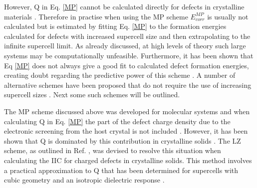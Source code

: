 \documentclass[11pt, twoside]{report}
\begin{document}
However, Q in Eq. \ref{MP} cannot be calculated directly for defects in crystalline materials \cite{Lany_defects_2008}. Therefore in practise when using the MP scheme $E^{MP}_{corr}$ is usually not calculated but is estimated by fitting Eq. \ref{MP} to the formation energies calculated for defects with increased supercell size and then extrapolating to the infinite supercell limit. As already discussed, at high levels of theory such large systems may be computationally unfeasible. Furthermore, it has been shown that Eq \ref{MP} does not always give a good fit to calculated defect formation energies, creating doubt regarding the predictive power of this scheme \cite{FNV}. A number of alternative schemes have been proposed that do not require the use of increasing supercell sizes \cite{MP, LeslieGillan, PeterSchultz, Lany_defects, FNV, kumagai_oba}. Next some such schemes will be outlined. 


The MP scheme \cite{MP} discussed above was developed for molecular systems and when calculating Q in Eq. \ref{MP} the part of the defect charge density due to the electronic screening from the host crystal is not included \cite{Lany_defects_2008, Lany_defects}. However, it has been shown that Q is dominated by this contribution in crystalline solids \cite{Lany_defects_2008}. The LZ scheme, as outlined in Ref. , was devised to resolve this situation when calculating the IIC for charged defects in crystalline solids.
This method involves a practical approximation to Q that has been determined for supercells with cubic geometry and an isotropic dielectric response \cite{Durrant_defects}.
\end{document}
